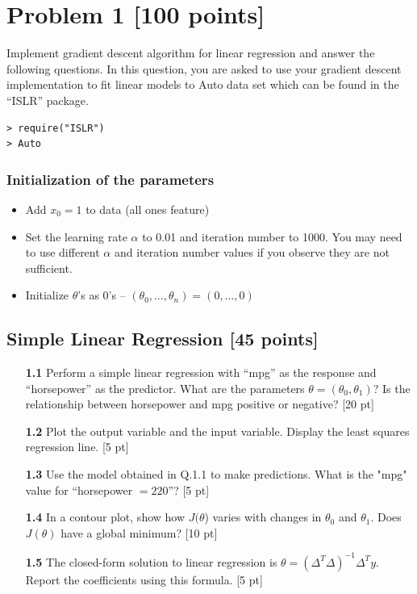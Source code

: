 \documentclass[a4paper,12pt]{article}
\newcommand{\quotes}[1]{``#1''}
\begin{document}


 
\newpage
\section*{Problem 1 [100 points]} 

Implement gradient descent algorithm for linear regression and answer the following questions. In this question, you are asked to use your gradient descent implementation to fit linear models to Auto data set which can be found in the \quotes{ISLR} package.

\begin{verbatim}
> require("ISLR")
> Auto
\end{verbatim}

\subsubsection*{Initialization of the parameters} 

\begin{itemize}
\item Add $x_0 =1$ to  data (all ones feature)
\item Set the learning rate $\alpha$ to 0.01 and iteration number to 1000. You may need to use different $\alpha$ and iteration number values if you observe they are  not sufficient.
\item Initialize $\theta$'s as $0$'s -- $(\theta_0,\ldots, \theta_n) = (0,\ldots,0)$
\end{itemize}



\subsection*{Simple Linear Regression  [45 points]} 

\begin{enumerate}
  \item[\textbf{1.1}] Perform a simple linear regression with \quotes{mpg} as the response and  \quotes{horsepower} as the predictor. What are the parameters $\theta = (\theta_0,\theta_1)$? Is the relationship between horsepower and mpg positive or negative?   [20 pt]
   \item[\textbf{1.2}] Plot the output variable and the input variable. Display the least squares regression line.   [5 pt]
  \item[\textbf{1.3}] Use the model obtained in Q.1.1 to make predictions. What is the "mpg" value for \quotes{horsepower $= 220$}?  [5 pt]
 \item[\textbf{1.4}] In a contour plot,  show how $J(\theta$) varies with changes in $\theta_0$ and $\theta_1$. Does $J(\theta)$ have a global minimum?  [10 pt]
 \item[\textbf{1.5}] The closed-form solution to linear regression is $\theta = (\Delta^T\Delta)^{-1} \Delta^Ty$. Report the coefficients using this formula.  [5 pt]
\end{enumerate}
\end{document}

